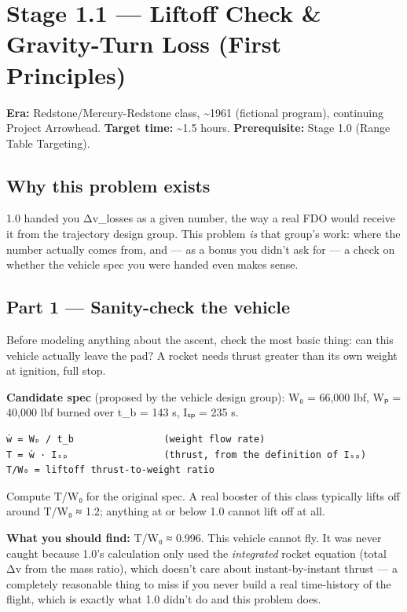 \documentclass[
  10pt,
]{article}
\author{}
\date{}
\begin{document}
\hypertarget{stage-1.1-liftoff-check-gravity-turn-loss-first-principles}{%
\section{Stage 1.1 --- Liftoff Check \& Gravity-Turn Loss (First
Principles)}\label{stage-1.1-liftoff-check-gravity-turn-loss-first-principles}}

\textbf{Era:} Redstone/Mercury-Redstone class, \textasciitilde1961
(fictional program), continuing Project Arrowhead. \textbf{Target time:}
\textasciitilde1.5 hours. \textbf{Prerequisite:} Stage 1.0 (Range Table
Targeting).

\hypertarget{why-this-problem-exists}{%
\subsection{Why this problem exists}\label{why-this-problem-exists}}

1.0 handed you Δv\_losses as a given number, the way a real FDO would
receive it from the trajectory design group. This problem \emph{is} that
group's work: where the number actually comes from, and --- as a bonus
you didn't ask for --- a check on whether the vehicle spec you were
handed even makes sense.

\hypertarget{part-1-sanity-check-the-vehicle}{%
\subsection{Part 1 --- Sanity-check the
vehicle}\label{part-1-sanity-check-the-vehicle}}

Before modeling anything about the ascent, check the most basic thing:
can this vehicle actually leave the pad? A rocket needs thrust greater
than its own weight at ignition, full stop.

\textbf{Candidate spec} (proposed by the vehicle design group): W₀ =
66,000 lbf, Wₚ = 40,000 lbf burned over t\_b = 143 s, Iₛₚ = 235 s.

\begin{verbatim}
ẇ = Wₚ / t_b                (weight flow rate)
T = ẇ · Iₛₚ                 (thrust, from the definition of Iₛₚ)
T/W₀ = liftoff thrust-to-weight ratio
\end{verbatim}

Compute T/W₀ for the original spec. A real booster of this class
typically lifts off around T/W₀ ≈ 1.2; anything at or below 1.0 cannot
lift off at all.

\textbf{What you should find:} T/W₀ ≈ 0.996. This vehicle cannot fly. It
was never caught because 1.0's calculation only used the
\emph{integrated} rocket equation (total Δv from the mass ratio), which
doesn't care about instant-by-instant thrust --- a completely reasonable
thing to miss if you never build a real time-history of the flight,
which is exactly what 1.0 didn't do and this problem does.
\end{document}

